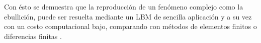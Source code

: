 Con ésto se demuestra que la reproducción de un fenómeno complejo como la ebullición, puede ser resuelta mediante un LBM de sencilla aplicación y a su vez con un costo computacional bajo, comparando con métodos de elementos finitos o diferencias finitas \cite{guo2013lattice}.




\iffalse

